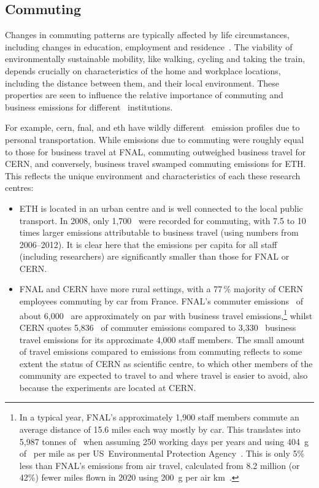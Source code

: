 \documentclass[../SustainableHEP.tex]{subfiles}
\begin{document}
\subsection{Commuting}

Changes in commuting patterns are typically affected by life circumstances, including changes in education, employment and residence~\cite{BEIGE2017179}.  The viability of environmentally sustainable mobility, like walking, cycling and taking the train, depends crucially on characteristics of the home and workplace locations, including the distance between them, and their local environment. These properties are seen to influence the relative importance of commuting and business emissions for different \ACR\ institutions. 

For example, \acrshort{cern}, \acrshort{fnal}, and \acrshort{eth} have wildly different \CdO\ emission profiles due to personal transportation. While emissions due to commuting were roughly equal to those for business travel at FNAL, commuting outweighed business travel for CERN, and conversely, business travel swamped commuting emissions for ETH. This reflects the unique environment and characteristics of each these research centres: 

\begin{itemize}
\item ETH is located in an urban centre and is well connected to the local public transport. In 2008, only 1,700 \tCdOe\ were recorded for commuting, with 7.5 to 10 times larger emissions attributable to business travel (using numbers from 2006--2012). 
It is clear here that the emissions per capita for all staff (including researchers) are significantly smaller than those for FNAL or CERN. 

\item FNAL and CERN have more rural settings, with a 77\,\% majority of CERN employees commuting by car from France. FNAL's commuter emissions~\cite{FermilabEnvReport} of about 6,000 \tCdOe\ are approximately on par with business travel emissions,\footnote{In a typical year, FNAL’s approximately 1,900 staff members commute an average distance of 15.6 miles each way mostly by car. This translates into 5,987 tonnes of \CdO\ when assuming 250 working days per years and using 404~g of \CdO\ per mile as per US~Environmental Protection Agency~\cite{USEPA}. This is only 5\;\% less than FNAL's emissions from air travel, calculated from 8.2 million (or 42\;\%) fewer miles flown in 2020 using 200~g per air km~\cite{RefAGU}.} whilst CERN quotes 5,836 \tCdOe\ of commuter emissions compared to 3,330 \tCdOe\ business travel emissions for its approximate 4,000 staff members. The small amount of travel emissions compared to emissions from commuting reflects to some extent the status of CERN as scientific centre, to which other members of the community are expected to travel to and where travel is easier to avoid, also because the experiments are located at CERN.
\end{itemize}
\end{document}
